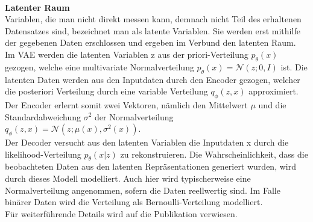 \documentclass[%
thesis=student,%
coverpage=false,%
titlepage=false,%
headmarks=true, %
german,%
font=libertine, %
math=newpxtx, %
BCOR=5mm,%
coverBCOR=11mm%
]{tumbook}
\theoremstyle{break}
\begin{document}
\\
\textbf{Latenter Raum}\\
Variablen, die man nicht direkt messen kann, demnach nicht Teil des erhaltenen Datensatzes sind, bezeichnet man als latente Variablen. Sie werden erst mithilfe der gegebenen Daten erschlossen und ergeben im Verbund den latenten Raum.\\
Im VAE werden die latenten Variablen z aus der priori-Verteilung $p_\theta(x)$ gezogen, welche eine multivariate Normalverteilung $p_\theta(x) = \mathcal{N}(z;0,I) $ ist. Die latenten Daten werden aus den Inputdaten durch den Encoder  gezogen, welcher die posteriori Verteilung durch eine variable Verteilung $q_\phi(z,x)$ approximiert. Der Encoder erlernt somit zwei Vektoren, nämlich den Mittelwert \( \mu \) und die Standardabweichung \( \sigma^2 \) der Normalverteilung $q_\phi(z,x) = \mathcal{N}(z;\mu(x),\sigma^2(x))$.\\
Der Decoder versucht aus den latenten Variablen die Inputdaten x durch die likelihood-Verteilung $p_\theta(x|z)$  zu rekonstruieren. Die  Wahrscheinlichkeit, dass die beobachteten Daten aus den latenten Repräsentationen generiert wurden, wird durch dieses Modell modelliert. Auch hier wird typischerweise eine Normalverteilung angenommen, sofern die  Daten reellwertig sind. Im Falle binärer Daten wird die Verteilung als Bernoulli-Verteilung modelliert. \\ Für weiterführende Details wird auf die Publikation \cite{Auto-EncodingVariationalBayes} verwiesen.\\
\end{document}
